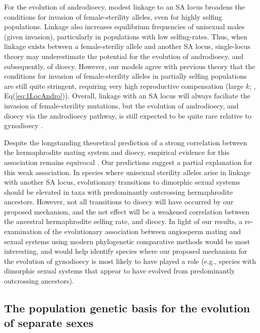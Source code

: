 \documentclass{article}
\begin{document}
For the evolution of androdioecy, modest linkage to an SA locus broadens the conditions for invasion of female-sterility alleles, even for highly selfing populations. Linkage also increases equilibrium frequencies of unisexual males (given invasion), particularly in populations with low selfing-rates. Thus, when linkage exists between a female-steriliy allele and another SA locus, single-locus theory may underestimate the potential for the evolution of androdioecy, and subsequently, of dioecy. However, our models agree with previous theory that the conditions for invasion of female-sterility alleles in partially selfing populations are still quite stringent, requiring very high reproductive compensation (large $k$; \citealt{Charlesworth1978a}, Eq(\ref{eq:1LocAndro})). Overall, linkage with an SA locus will always faciliate the invasion of female-sterility mutations, but the evolution of androdioecy, and dioecy via the androdioecy pathway, is still expected to be quite rare relative to gynodioecy \citep{Charlesworth1978a,Charlesworth2006,KaferPannell2017,Renner2014}.

Despite the longstanding theoretical prediction of a strong correlation between the hermaphrodite mating system and dioecy, empirical evidence for this association remains equivocal \citep{Charlesworth1985,Charlesworth2006,Renner2014}. Our predictions suggest a partial explanation for this weak association. In species where unisexual sterility alleles arise in linkage with another SA locus, evolutionary transitions to dimorphic sexual systems should be elevated in taxa with predominantly outcrossing hermaphrodite ancestors. However, not all transitions to dioecy will have occurred by our proposed mechanism, and the net effect will be a weakened correlation between the ancestral hermaphrodite selfing rate, and dieocy. In light of our results, a re-examination of the evolutionary association between angiosperm mating and sexual systems using modern phylogenetic comparative methods would be most interesting, and would help identify species where our proposed mechanism for the evolution of gynodioecy is most likely to have played a role (e.g., species with dimorphic sexual systems that appear to have evolved from predominantly outcrossing ancestors). 


\subsection*{The population genetic basis for the evolution of separate sexes}
\end{document}
